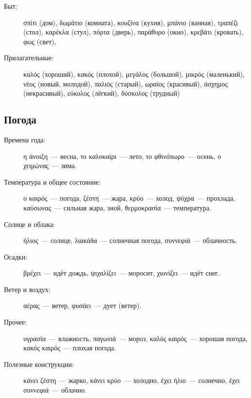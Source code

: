\documentclass[12pt]{article}
\newcommand{\my}[1]{\textcolor{gray!80!white}{#1}}
\newenvironment{page}{\clearpage\normalsize\null\vfill}{\vfill\null}
\begin{document}
\begin{page}
\begin{description}
			\item[Быт:]
			σπίτι \my{(дом)},
			δωμάτιο \my{(комната)},
			κουζίνα \my{(кухня)},
			μπάνιο \my{(ванная)},
			τραπέζι \my{(стол)},
			καρέκλα \my{(стул)},
			πόρτα \my{(дверь)},
			παράθυρο \my{(окно)},
			κρεβάτι \my{(кровать)},
			φως \my{(свет)},
			
			\item[Прилагательные:]
			καλός \my{(хороший)},
			κακός \my{(плохой)},
			μεγάλος \my{(большой)},
			μικρός \my{(маленький)},
			νέος \my{(новый, молодой)},
			παλιός \my{(старый)},
			ωραίος \my{(красивый)},
			άσχημος \my{(некрасивый)},
			εύκολος \my{(лёгкий)},
			δύσκολος \my{(трудный)}
		\end{description}
	\end{page}

    \begin{page}
        \subsection{Погода}
        \small
        \begin{description}
            \item[Времена года:]
            η άνοιξη~--- весна,
            το καλοκαίρι~--- лето,
            το φθινόπωρο~--- осень,
            ο χειμώνας~--- зима.

            \item[Температура и общее состояние:]
            ο καιρός~--- погода,
            ζέστη~--- жара,
            κρύο~--- холод,
            ψύχρα~--- прохлада,
            καύσωνας~--- сильная жара, зной,
            θερμοκρασία~--- температура.

            \item[Солнце и облака:]
            ήλιος~--- солнце,
            λιακάδα~--- солнечная погода,
            συννεφιά~--- облачность.

            \item[Осадки:]
            βρέχει~--- идёт дождь,
            ψιχαλίζει~--- моросит,
            χιονίζει~--- идёт снег.

            \item[Ветер и воздух:]
            αέρας~--- ветер,
            φυσάει~--- дует (ветер).

            \item[Прочее:]
            υγρασία~--- влажность,
            παγωνιά~--- мороз,
            καλός καιρός~--- хорошая погода,
            κακός καιρός~--- плохая погода.

            \item[Полезные конструкции:]
            κάνει ζέστη~--- жарко,
            κάνει κρύο~--- холодно,
            έχει ήλιο~--- солнечно,
            έχει συννεφιά~--- облачно.
        \end{description}
    \end{page}
\end{document}
